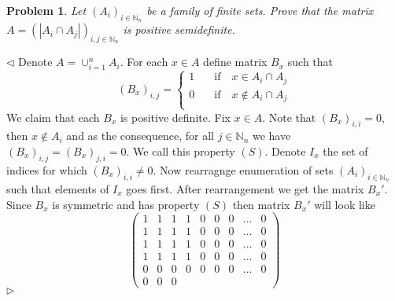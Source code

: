 \documentclass[12pt]{article}
\newtheorem{problem}{Problem}[subsection]
\newenvironment{solution}{\par $\triangleleft$}{$\triangleright$}
\begin{document}
\begin{problem} Let ${(A_i)}_{i\in\mathbb{N}_n}$ be a family of finite sets.
Prove that the matrix $A={(|A_i\cap A_j|)}_{i,j\in\mathbb{N}_n}$ is positive
semidefinite.
\end{problem}
\begin{solution} Denote $A=\cup_{i=1}^n A_i$. For each $x\in A$ define matrix
    $B_x$ such that
    $$
        {(B_x)}_{i,j}=
        \begin{cases}
            1 & \quad\mbox{if}\quad x\in A_i\cap A_j    \\
            0 & \quad\mbox{if}\quad x\notin A_i\cap A_j \\
        \end{cases}
    $$
    We claim that each $B_x$ is positive definite. Fix $x\in A$. Note that
    ${(B_x)}_{i,i}=0$, then $x\notin A_i$ and as the consequence, for all
    $j\in\mathbb{N}_n$ we have ${(B_x)}_{i,j}={(B_x)}_{j,i}=0$. We call this
    property $(S)$.  Denote $I_x$ the set of indices for which
    ${(B_x)}_{i,i}\neq 0$. Now rearragnge enumeration of sets
    ${(A_i)}_{i\in\mathbb{N}_n}$ such that elements of $I_x$ goes first. After
    rearrangement we get the matrix $B_x'$. Since $B_x$ is symmetric and has
    property $(S)$ then matrix $B_x'$ will look like
    $$
        \begin{pmatrix}
            1      &
            1      &
            1      &
            1      &
            0      &
            0      &
            0      &
            \ldots &
            0        \\
            1      &
            1      &
            1      &
            1      &
            0      &
            0      &
            0      &
            \ldots &
            0        \\
            1      &
            1      &
            1      &
            1      &
            0      &
            0      &
            0      &
            \ldots &
            0        \\
            1      &
            1      &
            1      &
            1      &
            0      &
            0      &
            0      &
            \ldots &
            0        \\
            0      &
            0      &
            0      &
            0      &
            0      &
            0      &
            0      &
            \ldots &
            0        \\
            0      &
            0      &
            0      &

\end{pmatrix}$$
\end{solution}
\end{document}
